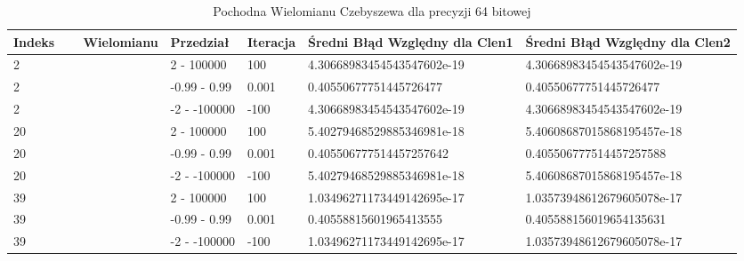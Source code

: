 \documentclass{article}
\begin{document}
\begin{table}
    \centering
    \begin{tabular}{ |p{2cm}|p{1.8cm}|p{1.1cm}|p{4.5cm}|p{4.5cm}|}
     \hline
     Indeks\ \ \ \ Wielomianu & Przedział & Iteracja & Średni Błąd Względny dla Clen1 & Średni Błąd Względny dla Clen2\\
     \hline
     2 & 2 - 100000 & 100 & 4.30668983454543547602e-19 & 4.30668983454543547602e-19\\
    \hline
     2 & -0.99 - 0.99 & 0.001 &  0.40550677751445726477 & 0.40550677751445726477\\
     \hline
     2 & -2 - -100000 & -100 & 4.30668983454543547602e-19 & 4.30668983454543547602e-19\\
     \hline
     20 & 2 - 100000 & 100 & 5.40279468529885346981e-18 & 5.40608687015868195457e-18\\
    \hline
     20 & -0.99 - 0.99 & 0.001 &  0.405506777514457257642 & 0.405506777514457257588\\
     \hline
     20 & -2 - -100000 & -100 & 5.40279468529885346981e-18 & 5.40608687015868195457e-18\\
     \hline
     39 & 2 - 100000 & 100 & 1.03496271173449142695e-17 & 1.03573948612679605078e-17\\
    \hline
     39 & -0.99 - 0.99 & 0.001 &  0.40558815601965413555 & 0.405588156019654135631\\
     \hline
     39 & -2 - -100000 & -100 & 1.03496271173449142695e-17 & 1.03573948612679605078e-17\\
     \hline
    \end{tabular}
    \caption{Pochodna Wielomianu Czebyszewa dla precyzji 64 bitowej}
\end{table}
\end{document}
